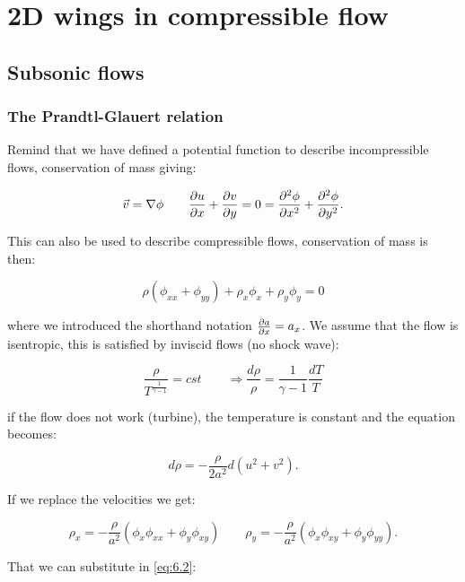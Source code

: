 
\chapter{2D wings in compressible flow}
\section{Subsonic flows}
\subsection{The Prandtl-Glauert relation}
	Remind that we have defined a potential function to describe incompressible flows, conservation of mass giving:
	
	\begin{equation}
	\vec{v} = \nabla \phi \qquad \frac{\partial u}{\partial x} + \frac{\partial v}{\partial y} = 0 = \frac{\partial^2 \phi}{\partial x^2} + \frac{\partial^2 \phi}{\partial y^2}.
	\end{equation}
	
	This can also be used to describe compressible flows, conservation of mass is then: 
	
	\begin{equation}
	\rho (\phi _{xx} + \phi _{yy}) + \rho _x \phi _x + \rho _y \phi _y = 0
	\label{eq:6.2}
	\end{equation}
	
	where we introduced the shorthand notation $\frac{\partial a}{\partial x} = a_x$. We assume that the flow is isentropic, this is satisfied by inviscid flows (no shock  wave): 
	
	\begin{equation}
	\frac{\rho}{T^{\frac{1}{\gamma -1}}} = cst \qquad \Rightarrow \frac{d \rho}{\rho} = \frac{1}{\gamma -1} \frac{dT}{T}
	\end{equation}
	
	if the flow does not work (turbine), the temperature is constant and the equation becomes:
	
	\begin{equation}
	d\rho = -\frac{\rho}{2a^2} d(u^2+v^2).
	\end{equation}

	If we replace the velocities we get: 
	
	\begin{equation}
	\rho _x = -\frac{\rho}{a^2} (\phi _x \phi _{xx} + \phi _y \phi _{xy}) \qquad \rho _y = -\frac{\rho}{a^2} (\phi _x \phi _{xy} + \phi _y \phi _{yy}).
	\end{equation}		
	
	That we can substitute in \eqref{eq:6.2}:
	
